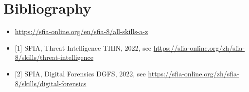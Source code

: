 \documentclass[a4paper, 11pt]{report}
\begin{document}

\newpage

\section{Bibliography} 
\begin{itemize}
\item{\url{https://sfia-online.org/en/sfia-8/all-skills-a-z}}
\item{[1] SFIA, Threat Intelligence THIN, 2022, see \url{https://sfia-online.org/zh/sfia-8/skills/threat-intelligence}}
\item{[2] SFIA, Digital Forensics DGFS, 2022, see \url{https://sfia-online.org/zh/sfia-8/skills/digital-forensics}}
\end{itemize}
\end{document}
